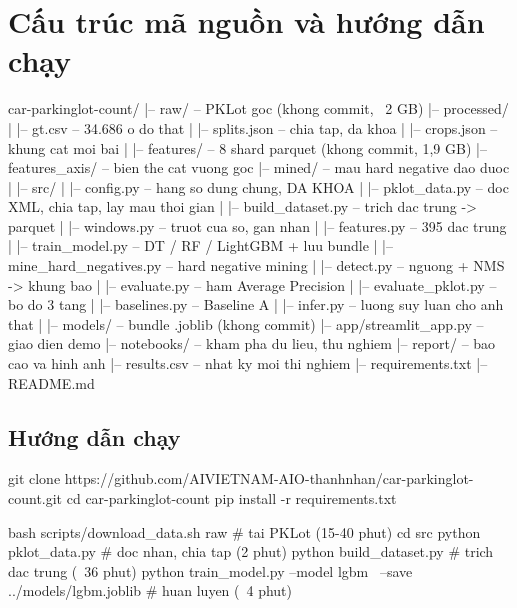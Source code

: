 \documentclass[12pt]{ai_conquer2026}
\begin{document}
\newpage
\section{Cấu trúc mã nguồn và hướng dẫn chạy}

\begin{aivnoutputbox}
car-parkinglot-count/
|-- raw/                          -- PKLot goc (khong commit, ~2 GB)
|-- processed/
|   |-- gt.csv                    -- 34.686 o do that
|   |-- splits.json               -- chia tap, da khoa
|   |-- crops.json                -- khung cat moi bai
|
|-- features/                     -- 8 shard parquet (khong commit, 1,9 GB)
|-- features_axis/                -- bien the cat vuong goc
|-- mined/                        -- mau hard negative dao duoc
|
|-- src/
|   |-- config.py                 -- hang so dung chung, DA KHOA
|   |-- pklot_data.py             -- doc XML, chia tap, lay mau thoi gian
|   |-- build_dataset.py          -- trich dac trung -> parquet
|   |-- windows.py                -- truot cua so, gan nhan
|   |-- features.py               -- 395 dac trung
|   |-- train_model.py            -- DT / RF / LightGBM + luu bundle
|   |-- mine_hard_negatives.py    -- hard negative mining
|   |-- detect.py                 -- nguong + NMS -> khung bao
|   |-- evaluate.py               -- ham Average Precision
|   |-- evaluate_pklot.py         -- bo do 3 tang
|   |-- baselines.py              -- Baseline A
|   |-- infer.py                  -- luong suy luan cho anh that
|
|-- models/                       -- bundle .joblib (khong commit)
|-- app/streamlit_app.py          -- giao dien demo
|-- notebooks/                    -- kham pha du lieu, thu nghiem
|-- report/                       -- bao cao va hinh anh
|-- results.csv                   -- nhat ky moi thi nghiem
|-- requirements.txt
|-- README.md
\end{aivnoutputbox}

\subsection{Hướng dẫn chạy}

\begin{aivncodebox}
\begin{python}
git clone https://github.com/AIVIETNAM-AIO-thanhnhan/car-parkinglot-count.git
cd car-parkinglot-count
pip install -r requirements.txt

bash scripts/download_data.sh raw          # tai PKLot   (15-40 phut)
cd src
python pklot_data.py                       # doc nhan, chia tap (2 phut)
python build_dataset.py                    # trich dac trung (~36 phut)
python train_model.py --model lgbm \
       --save ../models/lgbm.joblib        # huan luyen  (~4 phut)
\end{python}
\end{aivncodebox}
\end{document}
